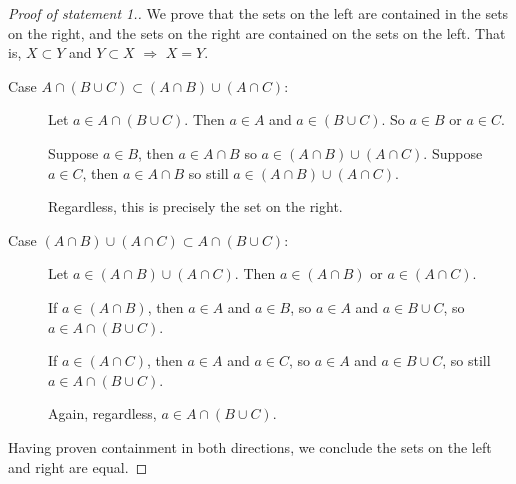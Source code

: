 \begin{proof}[Proof of statement 1.]
    We prove that the sets on the left are contained in the sets on the right, and the sets on the right are contained on the sets on the left. That is, $X\subset Y$ and $Y\subset X$ $\Rightarrow$ $X = Y$.

    \begin{description}
        \item[Case $A\cap(B\cup C)\subset(A\cap B) \cup (A\cap C)$:] Let $a\in A\cap (B\cup C)$. Then $a\in A$ and $a\in (B\cup C)$. So $a\in B$ or $a\in C$.

            Suppose $a\in B$, then $a\in A\cap B$ so $a\in (A\cap B)\cup (A\cap C)$. Suppose $a\in C$, then $a\in A\cap B$ so still $a\in (A\cap B)\cup (A\cap C)$.

            Regardless, this is precisely the set on the right.
        \item[Case $(A\cap B) \cup (A\cap C)\subset A\cap(B\cup C)$:] Let $a\in (A\cap B) \cup (A\cap C)$. Then $a\in (A\cap B)$ or $a\in (A\cap C)$.

            If $a\in (A\cap B)$, then $a\in A$ and $a\in B$, so $a\in A$ and $a\in B\cup C$, so $a\in A\cap(B\cup C)$.

            If $a\in (A\cap C)$, then $a\in A$ and $a\in C$, so $a\in A$ and $a\in B\cup C$, so still $a\in A\cap (B\cup C)$.

            Again, regardless, $a\in A\cap (B\cup C)$.
    \end{description}
    Having proven containment in both directions, we conclude the sets on the left and right are equal.
\end{proof}

